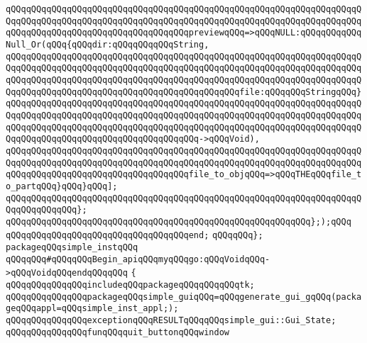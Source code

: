 \verb|qQQqqQQqqQQqqQQqqQQqqQQqqQQqqQQqqQQqqQQqqQQqqQQqqQQqqQQqqQQqqQQqqQQqqQQqqQQqqQQqqQQqqQQqqQQqqQQqqQQqqQQqqQQqqQQqqQQqqQQqqQQqqQQqqQQqqQQqqQQqqQQqqQQqqQQqqQQqqQQqqQQqqQQqqQQqqQQqpreviewqQQq=>qQQqNULL:qQQqqQQqqQQqNull_Or(qQQq{qQQqdir:qQQqqQQqqQQqString,|\newline
\verb|qQQqqQQqqQQqqQQqqQQqqQQqqQQqqQQqqQQqqQQqqQQqqQQqqQQqqQQqqQQqqQQqqQQqqQQqqQQqqQQqqQQqqQQqqQQqqQQqqQQqqQQqqQQqqQQqqQQqqQQqqQQqqQQqqQQqqQQqqQQqqQQqqQQqqQQqqQQqqQQqqQQqqQQqqQQqqQQqqQQqqQQqqQQqqQQqqQQqqQQqqQQqqQQqqQQqqQQqqQQqqQQqqQQqqQQqqQQqqQQqqQQqqQQqqQQqqQQqfile:qQQqqQQqStringqQQq}|\newline
\verb|qQQqqQQqqQQqqQQqqQQqqQQqqQQqqQQqqQQqqQQqqQQqqQQqqQQqqQQqqQQqqQQqqQQqqQQqqQQqqQQqqQQqqQQqqQQqqQQqqQQqqQQqqQQqqQQqqQQqqQQqqQQqqQQqqQQqqQQqqQQqqQQqqQQqqQQqqQQqqQQqqQQqqQQqqQQqqQQqqQQqqQQqqQQqqQQqqQQqqQQqqQQqqQQqqQQqqQQqqQQqqQQqqQQqqQQqqQQqqQQqqQQqqQQq->qQQqVoid),|\newline
\verb|qQQqqQQqqQQqqQQqqQQqqQQqqQQqqQQqqQQqqQQqqQQqqQQqqQQqqQQqqQQqqQQqqQQqqQQqqQQqqQQqqQQqqQQqqQQqqQQqqQQqqQQqqQQqqQQqqQQqqQQqqQQqqQQqqQQqqQQqqQQqqQQqqQQqqQQqqQQqqQQqqQQqqQQqqQQqqQQqfile_to_objqQQq=>qQQqTHEqQQqfile_to_partqQQq}qQQq}qQQq];|\newline
\verb|qQQqqQQqqQQqqQQqqQQqqQQqqQQqqQQqqQQqqQQqqQQqqQQqqQQqqQQqqQQqqQQqqQQqqQQqqQQqqQQqqQQq};|\newline
\verb|qQQqqQQqqQQqqQQqqQQqqQQqqQQqqQQqqQQqqQQqqQQqqQQqqQQqqQQqqQQq};);qQQq|\newline
\verb|qQQqqQQqqQQqqQQqqQQqqQQqqQQqqQQqqQQqend;|\newline
\verb|qQQqqQQq};|\newline
\newline
\verb|packageqQQqsimple_instqQQq|\newline
\verb|qQQqqQQq#qQQqqQQqBegin_apiqQQqmyqQQqgo:qQQqVoidqQQq->qQQqVoidqQQqendqQQqqQQq|\newline
\verb|{|\newline
\newline
\verb|qQQqqQQqqQQqqQQqincludeqQQqpackageqQQqqQQqqQQqtk;|\newline
\newline
\verb|qQQqqQQqqQQqqQQqpackageqQQqsimple_guiqQQq=qQQqgenerate_gui_gqQQq(packageqQQqappl=qQQqsimple_inst_appl;);|\newline
\newline
\verb|qQQqqQQqqQQqqQQqexceptionqQQqRESULTqQQqqQQqsimple_gui::Gui_State;|\newline
\newline
\verb|qQQqqQQqqQQqqQQqfunqQQqquit_buttonqQQqwindow|\newline
